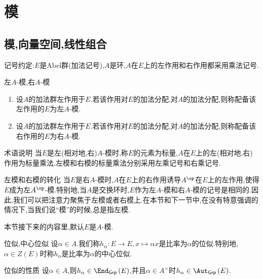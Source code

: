 \chapter{模}

\section{模,向量空间,线性组合}

记号约定:$E$是Abel群(加法记号),$A$是环,$A$在$E$上的左作用和右作用都采用乘法记号.

\begin{definition}{左$A$-模,右$A$-模}{}
	\begin{enumerate}
		\item 设$A$的加法群左作用于$E$.若该作用对$E$的加法分配,对$A$的加法分配,则称配备该左作用的$E$为左$A$-模.
		\item 设$A$的加法群左作用于$E$.若该作用对$E$的加法分配,对$A$的加法分配,则称配备该右作用的$E$为右$A$-模.
	\end{enumerate}
\end{definition}

\begin{remark}{术语说明}{}
	当$E$是左(相对地,右)$A$-模时,称$E$的元素为标量,$A$在$E$上的左(相对地,右)作用为标量乘法.左模和右模的标量乘法分别采用左乘记号和右乘记号.
\end{remark}

\begin{remark}{左模和右模的转化}{}
	当$E$是右$A$-模时,$A$在$E$上的右作用诱导$A^{\op}$在$E$上的左作用,使得$E$成为左$A^{\op}$-模.特别地,当$A$是交换环时,$E$作为左$A$-模和右$A$-模的记号是相同的.因此,我们可以把注意力聚焦于左模或者右模上.在本节和下一节中,在没有特意强调的情况下,当我们说``模''的时候,总是指左模.
\end{remark}

本节接下来的内容里,默认$E$是$A$-模.

\begin{definition}{位似,中心位似}{}
	设$\alpha\in A$.我们称$h_{\alpha}:E\to E,x\mapsto\alpha x$是比率为$\alpha$的位似.特别地,$\alpha\in Z\left(E\right)$时称$h_{\alpha}$是比率为$\alpha$的中心位似.
\end{definition}

\begin{proposition}{位似的性质}{}
	设$\alpha\in A$,则$h_{\alpha}\in\End_{\mathsf{Grp}}\left(E\right)$,并且$\alpha\in A^{\times}$时$h_{\alpha}\in\Aut_{\mathsf{Grp}}\left(E\right)$.
\end{proposition}


